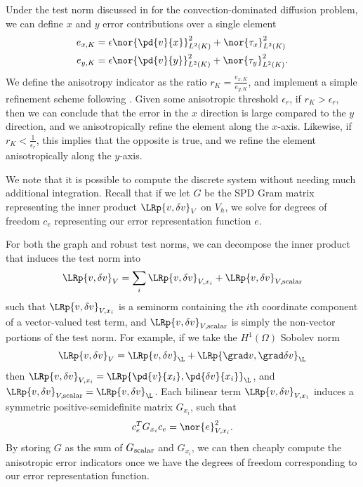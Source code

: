 Under the test norm discussed in \cite{ChanHeuerBui-ThanhDemkowicz12} for the convection-dominated diffusion problem, we can define $x$ and $y$ error contributions over a single element
\begin{align*}
e_{x,K} &= \epsilon \nor{\pd{v}{x}}_{L^2(K)}^2 + \nor{\tau_x}_{L^2(K)}^2 \\
e_{y,K} &= \epsilon \nor{\pd{v}{y}}_{L^2(K)}^2 + \nor{\tau_y}_{L^2(K)}^2.
\end{align*}
We define the anisotropy indicator as the ratio $r_K = \frac{e_{x,K}}{e_{y,K}}$, and implement a simple refinement scheme following \cite{DPG3}.  Given some anisotropic threshold $\epsilon_r$, if $r_K>\epsilon_r$, then we can conclude that the error in the $x$ direction is large compared to the $y$ direction, and we anisotropically refine the element along the $x$-axis.  Likewise, if $r_K < \frac{1}{\epsilon_r}$, this implies that the opposite is true, and we refine the element anisotropically along the $y$-axis.  

We note that it is possible to compute the discrete system without needing much additional integration.  Recall that if we let $G$ be the SPD Gram matrix representing the inner product $\LRp{v,\delta v}_V$ on $V_h$, we solve for degrees of freedom $c_e$ representing our error representation function $e$.  

For both the graph and robust test norms, we can decompose the inner product that induces the test norm into 
\[
\LRp{v,\delta v}_V = \sum_i \LRp{v,\delta v}_{V,x_i} + \LRp{v,\delta v}_{V,{\rm scalar}}
\]
such that $\LRp{v,\delta v}_{V,x_i}$ is a seminorm containing the $i$th coordinate component of a vector-valued test term, and $\LRp{v,\delta v}_{V,{\rm scalar}}$ is simply the non-vector portions of the test norm.  For example, if we take the $H^1(\Omega)$ Sobolev norm
\[
\LRp{v,\delta v}_V = \LRp{v,\delta v}_{\L} + \LRp{\grad v,\grad \delta v}_{\L}
\]
then $\LRp{v,\delta v}_{V,x_i} = \LRp{\pd{v}{x_i},\pd{\delta v}{x_i}}_{\L}$, and $\LRp{v,\delta v}_{V,{\rm scalar}} = \LRp{v,\delta v}_{\L}$.  Each bilinear term $\LRp{v,\delta v}_{V,x_i}$ induces a symmetric positive-semidefinite matrix $G_{x_i}$, such that 
\[
c_e^TG_{x_i}c_e = \nor{e}^2_{V,x_i}.
\]
By storing $G$ as the sum of $G_{\rm scalar}$ and $G_{x_i}$, we can then cheaply compute the anisotropic error indicators once we have the degrees of freedom corresponding to our error representation function.  



